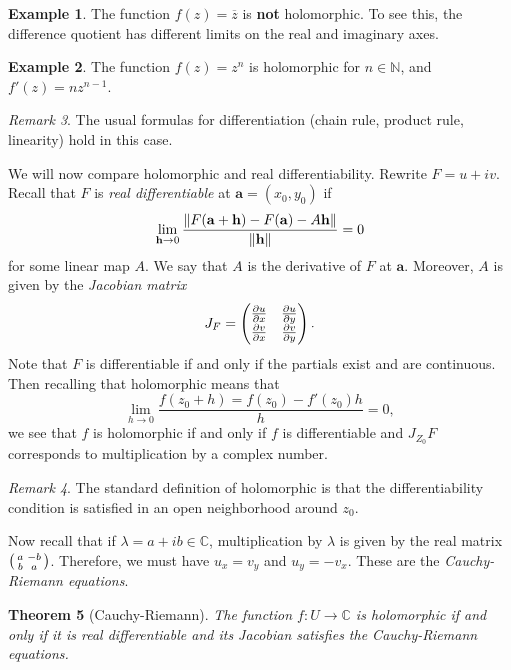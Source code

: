 \documentclass[leqno, openany]{memoir}
\newtheorem{thm}{Theorem}[section]
\theoremstyle{definition}
\newtheorem{exm}[thm]{Example}
\theoremstyle{remark}
\newtheorem{rmk}[thm]{Remark}
\theoremstyle{plain}
\theoremstyle{definition}
\theoremstyle{remark}
\newcommand{\C}{\mathbb{C}}
\newcommand{\N}{\mathbb{N}}
\newcommand{\ol}[1]{\overline{#1}}
\begin{document}
\begin{exm} The function $f(z) = \ol{z}$ is \textbf{not} holomorphic. To see
this, the difference quotient has different limits on the real and imaginary
axes.  \end{exm}

\begin{exm} The function $f(z) = z^n$ is holomorphic for $n \in \N$, and $f'(z)
= nz^{n-1}$.  \end{exm}

\begin{rmk} The usual formulas for differentiation (chain rule, product rule,
linearity) hold in this case.  \end{rmk}

We will now compare holomorphic and real differentiability. Rewrite $F = u +
iv$. Recall that $F$ is \textit{real differentiable} at $\mathbf{a} =
(x_0,y_0)$ if \[ \lim_{\mathbf{h} \to 0} \frac{\norm{F(\mathbf{a} + \mathbf{h})
- F(\mathbf{a}) - A \mathbf{h}}}{\norm{\mathbf{h}}} = 0 \] for some linear map
$A$. We say that $A$ is the derivative of $F$ at $\mathbf{a}$. Moreover, $A$ is
given by the \textit{Jacobian matrix} \[ J_F = \begin{pmatrix} \pdv{u}{x} &
    \pdv{u}{y} \\ \pdv{v}{x} & \pdv{v}{y} \end{pmatrix}. \] Note that $F$ is
    differentiable if and only if the partials exist and are continuous. Then
    recalling that holomorphic means that \[ \lim_{h \to 0} \frac{f(z_0 + h) =
    f(z_0) - f'(z_0)h}{h} = 0, \] we see that $f$ is holomorphic if and only if
    $f$ is differentiable and $J_{Z_0} F$ corresponds to multiplication by a
    complex number.

\begin{rmk} The standard definition of holomorphic is that the
differentiability condition is satisfied in an open neighborhood around $z_0$.
\end{rmk}

Now recall that if $\lambda = a+ib \in \C$, multiplication by $\lambda$ is
given by the real matrix $\begin{psmallmatrix} a & -b \\ b & a
\end{psmallmatrix}$. Therefore, we must have $u_x = v_y$ and $u_y = -v_x$.
These are the \textit{Cauchy-Riemann equations}. 

\begin{thm}[Cauchy-Riemann] The function $f \colon U \to \C$ is holomorphic if
and only if it is real differentiable and its Jacobian satisfies the
Cauchy-Riemann equations.  \end{thm}
\end{document}
